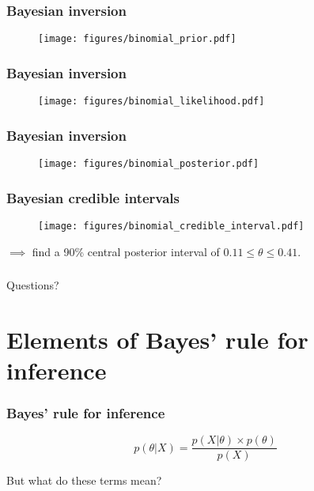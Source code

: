 \documentclass{beamer}
\begin{document}
\begin{frame}
	\frametitle{Bayesian inversion}
	
		\begin{figure}[ht]
			\centerline{\texttt{[image: figures/binomial\_prior.pdf]}}
		\end{figure}
	
\end{frame}

\begin{frame}
	\frametitle{Bayesian inversion}
	
	\begin{figure}[ht]
		\centerline{\texttt{[image: figures/binomial\_likelihood.pdf]}}
	\end{figure}
	
\end{frame}

\begin{frame}
	\frametitle{Bayesian inversion}
	
	\begin{figure}[ht]
		\centerline{\texttt{[image: figures/binomial\_posterior.pdf]}}
	\end{figure}
	
\end{frame}

\begin{frame}
	\frametitle{Bayesian credible intervals}
	
	\begin{figure}[ht]
		\centerline{\texttt{[image: figures/binomial\_credible\_interval.pdf]}}
	\end{figure}
	
	$\implies$ find a 90\% central posterior interval of $0.11\leq\theta\leq 0.41$.
	
\end{frame}

\begin{frame}
	\frametitle{}
	{\Huge Questions?}
\end{frame}

\section{Elements of Bayes' rule for inference}
\frame{\tableofcontents[currentsection]}

\begin{frame}
	\frametitle{Bayes' rule for inference}
	
	
	\begin{equation}
	p(\theta|X) = \frac{p(X|\theta)\times p(\theta)}{p(X)}
	\end{equation}
	
	But what do these terms mean?
	
\end{frame}
\end{document}
